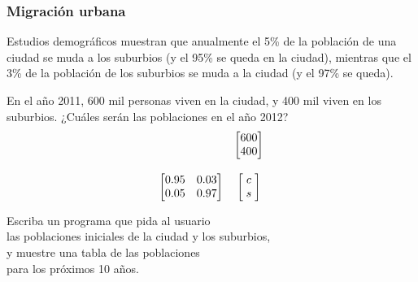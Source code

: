 \documentclass[12pt]{beamer}
\begin{document}
  \begin{frame}
    \label{ejercicio-migracion}
    \frametitle{Migración urbana}
    Estudios demográficos muestran que anualmente
    el 5\% de la población de una ciudad
    se muda a los suburbios (y el 95\% se queda en la ciudad),
    mientras que el 3\% de la población de los suburbios
    se muda a la ciudad (y el 97\% se queda).
    \vspace{2ex}

    En el año 2011,
    600 mil personas viven en la ciudad,
    y 400 mil viven en los suburbios.
    ¿Cuáles serán las poblaciones en el año 2012?
    \pause
    \[
      \begin{array}{cc}
        &
        \begin{bmatrix} 600 \\ 400 \\ \end{bmatrix} \vspace{3ex} \\
        \begin{bmatrix}
          0.95 & 0.03 \\
          0.05 & 0.97 \\
        \end{bmatrix} &
        \begin{bmatrix} \;c\; \\ \;s\; \\ \end{bmatrix}
      \end{array}
    \]
  \end{frame}

  \begin{frame}
    \label{problema-migracion}
    Escriba un programa que pida al usuario \\
    las poblaciones iniciales de la ciudad y los suburbios, \\
    y muestre una tabla de las poblaciones \\
    para los próximos 10 años.
    \footnotesize
    
  \end{frame}
\end{document}
